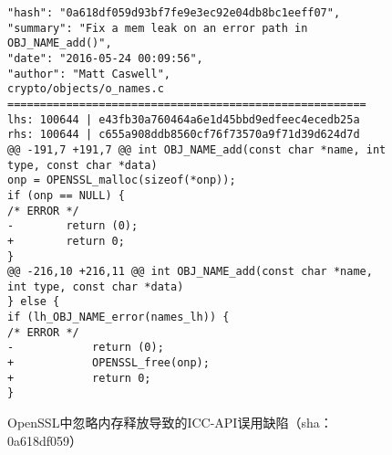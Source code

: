 \begin{figure}[t]
	\centering
\begin{lstlisting}
"hash": "0a618df059d93bf7fe9e3ec92e04db8bc1eeff07",
"summary": "Fix a mem leak on an error path in OBJ_NAME_add()",
"date": "2016-05-24 00:09:56",
"author": "Matt Caswell",
crypto/objects/o_names.c
=======================================================
lhs: 100644 | e43fb30a760464a6e1d45bbd9edfeec4ecedb25a
rhs: 100644 | c655a908ddb8560cf76f73570a9f71d39d624d7d
@@ -191,7 +191,7 @@ int OBJ_NAME_add(const char *name, int type, const char *data)
onp = OPENSSL_malloc(sizeof(*onp));
if (onp == NULL) {
/* ERROR */
-        return (0);
+        return 0;
}
@@ -216,10 +216,11 @@ int OBJ_NAME_add(const char *name, int type, const char *data)
} else {
if (lh_OBJ_NAME_error(names_lh)) {
/* ERROR */
-            return (0);
+            OPENSSL_free(onp);
+            return 0;
}

\end{lstlisting}
	\caption{
	OpenSSL中忽略内存释放导致的ICC-API误用缺陷（sha：0a618df059）
	}
	\label{fig:2-3-icc-1}
\end{figure}